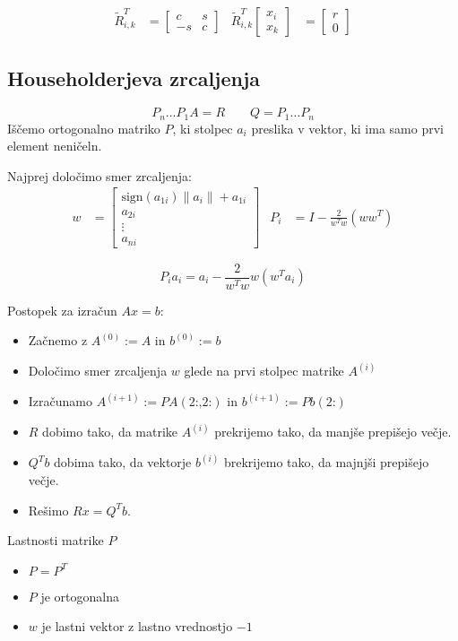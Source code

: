 \begin{multicols}{4}
\begin{align*}
	\tilde{R}_{i,k}^T &= \begin{bmatrix}
		c & s \\
		-s & c
	\end{bmatrix} &
	\tilde{R}_{i,k}^T \begin{bmatrix}
		x_i \\ x_k
	\end{bmatrix}
	&=
	\begin{bmatrix}
		r \\ 0
	\end{bmatrix}
\end{align*}

\subsection{Householderjeva zrcaljenja}
\[ P_n \dots P_1 A = R \qquad Q = P_1 \dots P_n\]
Iščemo ortogonalno matriko $P$, ki stolpec $a_i$ preslika v vektor, ki ima samo prvi element neničeln.

Najprej določimo smer zrcaljenja:
\begin{align*}
	w &= \begin{bmatrix}
		\text{sign}(a_{1i}) \| a_i \| + a_{1i} \\
		a_{2i} \\
		\vdots \\
		a_{ni}
	\end{bmatrix} &
	P_i &= I - \frac{2}{w^Tw}(ww^T)
\end{align*}

\[ P_i a_i = a_i - \frac{2}{w^Tw}w(w^Ta_i) \]

Postopek za izračun $Ax = b:$
\begin{itemize}
	\item Začnemo z $A^{(0)} := A$ in $b^{(0)} := b$
	\item Določimo smer zrcaljenja $w$ glede na prvi stolpec matrike $A^{(i)}$
	\item Izračunamo $A^{(i+1)} := PA(\text{2:,2:})$ in $b^{(i+1)} := Pb(\text{2:})$
	\item $R$ dobimo tako, da matrike $A^{(i)}$ prekrijemo tako, da manjše prepišejo večje.
	\item $Q^Tb$ dobima tako, da vektorje $b^{(i)}$ brekrijemo tako, da majnjši prepišejo večje.
	\item Rešimo $Rx = Q^Tb$.
\end{itemize}

Lastnosti matrike $P$
\begin{itemize}
	\item $P = P^T$
	\item $P$ je ortogonalna
	\item $w$ je lastni vektor z lastno vrednostjo $-1$
\end{itemize}


\end{multicols}
